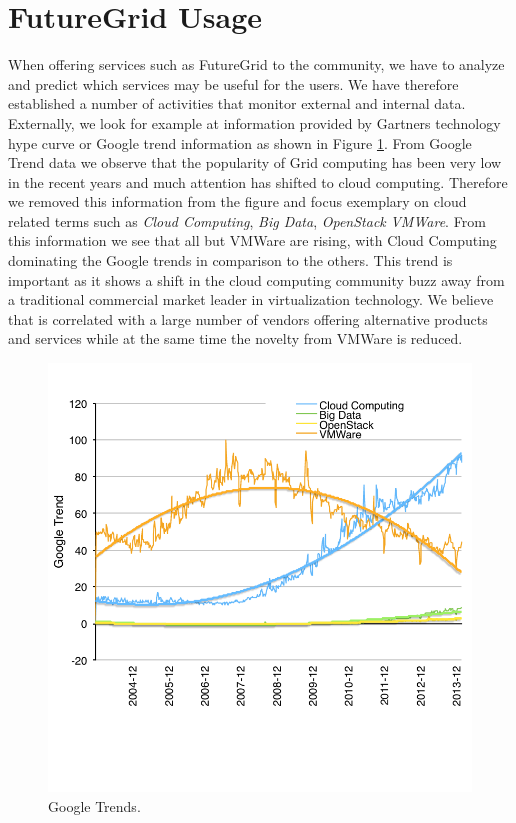 \documentclass{article}
\newcommand{\FILE}[1]{}
\begin{document}
\FILE{usage.tex}

\section{FutureGrid Usage}\label{S:usage}

When offering services such as FutureGrid to the community, we have to analyze and predict which services may be useful for the users. We have therefore established a number of activities that monitor external and internal data. Externally, we look for example at information provided by Gartners technology hype curve \cite{www-gartner-2013} or Google trend information as shown in Figure \ref{F:google-trend}. From Google Trend data we observe that the popularity of Grid computing has been very low in the recent years and much attention has shifted to cloud computing. Therefore we removed this information from the figure and focus exemplary on cloud related terms such as {\em Cloud Computing}, {\em Big Data}, {\em OpenStack} {\em VMWare}.  From this information we see that all but VMWare are rising, with Cloud Computing dominating the Google trends in comparison to the others. This trend is important as it shows a shift in the cloud computing community buzz away from a traditional commercial market leader in virtualization technology. We believe that is correlated with a large number of vendors offering alternative products and services while at the same time the novelty from VMWare is reduced.

\begin{figure}[htb]
 \centering
    \includegraphics[width=.75\textwidth]{images/google-trend.pdf}
  \caption{Google Trends.}\label{F:google-trend}
\end{figure}
\end{document}
